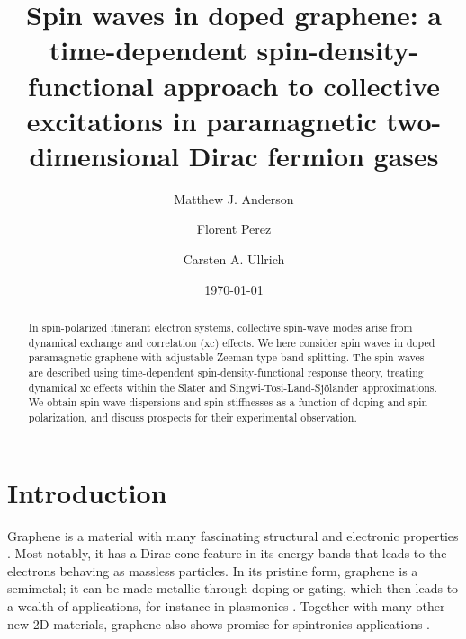 \documentclass[aps,prb,twocolumn,superscriptaddress]{revtex4-2}
\begin{document}
\title{Spin waves in doped graphene: a time-dependent spin-density-functional approach to
collective excitations in paramagnetic two-dimensional Dirac fermion gases}

\author{Matthew J. Anderson}

\author{Florent Perez}

\author{Carsten A. Ullrich}

\date{\today }

\begin{abstract}
In spin-polarized itinerant electron systems, collective spin-wave modes arise from dynamical exchange and correlation (xc) effects.
We here consider spin waves in doped paramagnetic graphene with adjustable Zeeman-type band splitting. The spin waves
are described using time-dependent spin-density-functional response theory, treating dynamical xc effects within the
Slater and Singwi-Tosi-Land-Sj{\"o}lander approximations. We obtain spin-wave dispersions and spin stiffnesses as a function
of doping and spin polarization, and discuss prospects for their experimental observation.
\end{abstract}

\maketitle

\section{Introduction}\label{sec1}

Graphene is a material with many fascinating structural and electronic properties \cite{Neto2009}.
Most notably, it has a Dirac cone feature in its energy bands that leads to the electrons behaving as massless particles.
In its pristine form, graphene is a semimetal; it can be made metallic through doping or gating, which then leads to a wealth
of applications, for instance in plasmonics \cite{Koppens2011,Grigorenko2012,Luo2013,Huang2017}. Together with many other new 2D materials, graphene also shows promise
for spintronics applications \cite{Avsar2020}.
\end{document}

